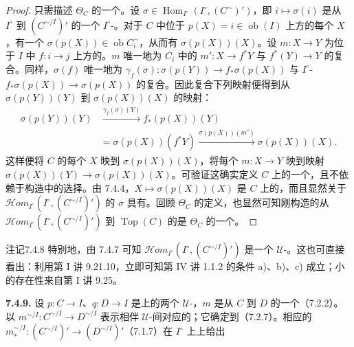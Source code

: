 \begin{proof}
只需描述 $\Theta_C$ 的一个。设 $\sigma\in\operatorname{Hom}_{I^\circ}(I^\circ,(C^\sim)')$，即 $i\mapsto\sigma(i)$ 是从 $I^\circ$ 到 $(C^{\sim/I})'$ 的一个 $I^\circ$-。对于 $C$ 中位于 $p(X)=i\in\operatorname{ob}(I)$ 上方的每个 $X$，有一个 $\sigma(p(X))\in\operatorname{ob}C_i^\sim$，从而有 $\sigma(p(X))(X)$。设 $m:X\to Y$ 为位于 $I$ 中 $f:i\to j$ 上方的。$m$ 唯一地为 $C_i$ 中的 $m':X\to f^*Y$ 与 $f^*(Y)\to Y$ 的复合。同样，$\sigma(f)$ 唯一地为 $\gamma_f(\sigma):\sigma(p(Y))\to f_*\sigma(p(X))$ 与 $I^\circ$- $f_*\sigma(p(X))\to\sigma(p(X))$ 的复合。因此复合下列映射便得到从 $\sigma(p(Y))(Y)$ 到 $\sigma(p(X))(X)$ 的映射：
\[\begin{aligned}
\sigma(p(Y))(Y)&\xrightarrow{\gamma_f(\sigma)(Y)}f_*(p(X))(Y)\\
&=\sigma(p(X))(f^*Y)\xrightarrow{\sigma(p(X))(m')}\sigma(p(X))(X).
\end{aligned}\]
这样便将 $C$ 的每个 $X$ 映到 $\sigma(p(X))(X)$，将每个 $m:X\to Y$ 映到映射 $\sigma(p(X))(Y)\to\sigma(p(X))(X)$。可验证这确实定义 $C$ 上的一个，且不依赖于构造中的选择。由 7.4.4，$X\mapsto\sigma(p(X))(X)$ 是 $C$ 上的，而且显然关于 $\mathscr{H}\!om_{I^\circ}(I^\circ,(C^{\sim/I})')$ 的 $\sigma$ 具有。回顾 $\Theta_C$ 的定义，也显然可知刚构造的从 $\mathscr{H}\!om_{I^\circ}(I^\circ,(C^{\sim/I})')$ 到 $\operatorname{Top}(C)$ 的是 $\Theta_C$ 的一个。
\end{proof}
\begin{SGAresult}{注记}{7.4.8}
特别地，由 7.4.7 可知 $\mathscr{H}\!om_{I^\circ}(I^\circ,(C^{\sim/I})')$ 是一个 $\mathcal U$-。这也可直接看出：利用第 I 讲 9.21.10，立即可知第 IV 讲 1.1.2 的条件 a)、b)、c) 成立；小的存在性来自第 I 讲 9.25。
\end{SGAresult}
\textbf{7.4.9.} 设 $p:C\to I$、$q:D\to I$ 是上的两个 $\mathcal U$-，$m$ 是从 $C$ 到 $D$ 的一个（7.2.2）。以 $m^{\sim/I}:C^{\sim/I}\to D^{\sim/I}$ 表示相伴 $\mathcal U$-间对应的；它确定到（7.2.7）。相应的 $m_*^{\sim/I}:(C^{\sim/I})'\to(D^{\sim/I})'$（7.1.7）在 $I^\circ$ 上上给出
